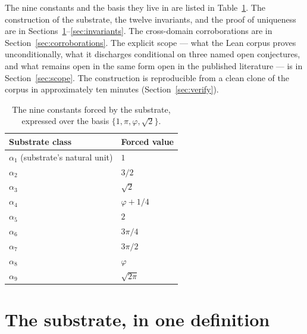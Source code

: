 \documentclass[11pt,a4paper]{amsart}
\theoremstyle{plain}
\theoremstyle{definition}
\begin{document}
The nine constants and the basis they live in are listed in Table~\ref{tab:nine}. The construction of the substrate, the twelve invariants, and the proof of uniqueness are in Sections~\ref{sec:substrate}--\ref{sec:invariants}. The cross-domain corroborations are in Section~\ref{sec:corroborations}. The explicit scope --- what the Lean corpus proves unconditionally, what it discharges conditional on three named open conjectures, and what remains open in the same form open in the published literature --- is in Section~\ref{sec:scope}. The construction is reproducible from a clean clone of the corpus in approximately ten minutes (Section~\ref{sec:verify}).

\begin{table}[h]
\centering
\caption{The nine constants forced by the substrate, expressed over the basis $\{1,\pi,\varphi,\sqrt{2}\}$.}\label{tab:nine}
\begin{tabular}{ll}
\toprule
Substrate class & Forced value \\
\midrule
$\alpha_1$ (substrate's natural unit) & $1$            \\
$\alpha_2$                            & $3/2$          \\
$\alpha_3$                            & $\sqrt{2}$     \\
$\alpha_4$                            & $\varphi+1/4$  \\
$\alpha_5$                            & $2$            \\
$\alpha_6$                            & $3\pi/4$       \\
$\alpha_7$                            & $3\pi/2$       \\
$\alpha_8$                            & $\varphi$      \\
$\alpha_9$                            & $\sqrt{2\pi}$  \\
\bottomrule
\end{tabular}
\end{table}

\section{The substrate, in one definition}\label{sec:substrate}
\end{document}
